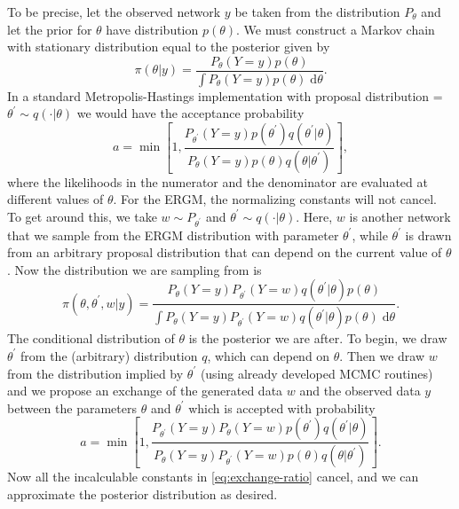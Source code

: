 \documentclass[12pt,twoside]{reedthesis}
\theoremstyle{definition}
\theoremstyle{definition}
\theoremstyle{remark}
\begin{document}
To be precise, let the observed network \(y\) be taken from the
distribution \(P_{\theta}\) and let the prior for \(\theta\) have
distribution \(p(\theta)\). We must construct a Markov chain with
stationary distribution equal to the posterior given by
\begin{equation}
\pi(\theta | y) = \frac{P_{\theta}(Y = y) p(\theta)}{\int P_{\theta}(Y = y) p(\theta) \; \mathrm{d}\theta}.
\label{eq:naive-post}
\end{equation}
In a standard Metropolis-Hastings implementation with proposal
distribution
\relpenalty=\maxdimen \(\theta^{\prime} \sim q( \cdot | \theta)\)
 we would have the acceptance probability
\begin{equation}
a = \min \left[ 1, \frac{P_{\theta^{\prime}}(Y = y)p(\theta^{\prime})q(\theta^{\prime}|\theta)}{P_{\theta}(Y = y)p(\theta)q(\theta|\theta^{\prime})} \right],
\label{eq:naive-ratio}
\end{equation}
where the likelihoods in the numerator and the denominator are evaluated
at different values of \(\theta\). For the ERGM, the normalizing
constants will not cancel. To get around this, we take
\(w \sim P_{\theta^{\prime}}\) and
\(\theta^{\prime} \sim q(\cdot|\theta)\). Here, \(w\) is another network
that we sample from the ERGM distribution with parameter
\(\theta^{\prime}\), while \(\theta^{\prime}\) is drawn from an
arbitrary proposal distribution that can depend on the current value of
\(\theta\). Now the distribution we are sampling from is
\begin{equation}
\pi(\theta, \theta^{\prime}, w |y) = \frac{P_{\theta}(Y = y) P_{\theta^{\prime}}(Y = w) q(\theta^{\prime} | \theta) p(\theta)}{\int P_{\theta}(Y = y) P_{\theta^{\prime}}(Y = w) q(\theta^{\prime} | \theta) p(\theta) \; \mathrm{d} \theta}.
\label{eq:exch-bayes}
\end{equation}
The conditional distribution of \(\theta\) is the posterior we are
after. To begin, we draw \(\theta^{\prime}\) from the (arbitrary)
distribution \(q\), which can depend on \(\theta\). Then we draw \(w\)
from the distribution implied by \(\theta^{\prime}\) (using already
developed MCMC routines) and we propose an exchange of the generated
data \(w\) and the observed data \(y\) between the parameters \(\theta\)
and \(\theta^{\prime}\) which is accepted with probability
\begin{equation}
a = \min \left[ 1, \frac{P_{\theta^{\prime}}(Y = y) P_{\theta}(Y=w)p(\theta^{\prime})q(\theta^{\prime}|\theta)}{P_{\theta}(Y = y)P_{\theta^{\prime}}(Y = w)p(\theta)q(\theta|\theta^{\prime})} \right].
\label{eq:exchange-ratio}
\end{equation}
Now all the incalculable constants in \eqref{eq:exchange-ratio} cancel,
and we can approximate the posterior distribution as desired.
\end{document}
